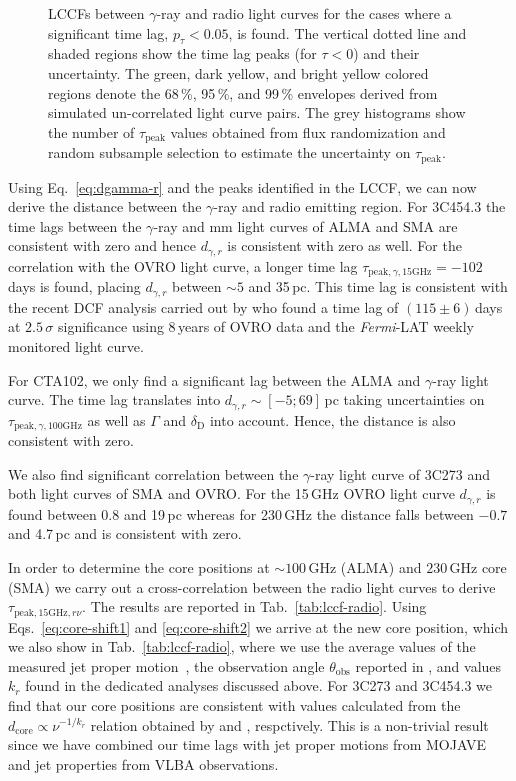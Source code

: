 \documentclass[twocolumn,linenumbers]{aastex62}
\newcommand{\gray}{$\gamma$-ray\xspace}
\newcommand{\fermiLAT}{\emph{Fermi}-LAT\xspace}
\begin{document}
\begin{figure}
    \caption{LCCFs between \gray and radio light curves for the cases where a significant time lag, $p_\tau < 0.05$, is found. The vertical dotted line and shaded regions show the time lag peaks (for $\tau < 0$) and their uncertainty. 
    The green, dark yellow, and bright yellow colored regions denote the 68\,\%, 95\,\%, and 99\,\% envelopes derived from simulated un-correlated light curve pairs. 
    The grey histograms show the number of $\tau_\mathrm{peak}$ values obtained from flux randomization and random subsample selection to estimate the uncertainty on $\tau_\mathrm{peak}$.}
    \label{fig:lccf}
\end{figure}

Using Eq.~\ref{eq:dgamma-r} and the peaks identified in the LCCF, we can now derive the distance between the \gray and radio emitting region. 
For 3C454.3 the time lags between the \gray and mm light curves of ALMA and SMA are consistent with zero and hence $d_{\gamma,r}$ is consistent with zero as well.
For the correlation with the OVRO light curve, a longer time lag $\tau_{\mathrm{peak},\gamma,15\mathrm{GHz}} = -102$ days is found, placing $d_{\gamma,r}$ between $\sim 5$ and 35\,pc.
This time lag is consistent with the recent DCF analysis carried out by \citet{2018MNRAS.480.5517L} who found a time lag of $(115\pm6)$\,days at $2.5\,\sigma$ significance using 8\,years of OVRO data and the \fermiLAT weekly monitored light curve. 

For CTA102, we only find a significant lag between the ALMA and \gray light curve. 
The time lag translates into $d_{\gamma,r} \sim [-5;69]\,$pc taking uncertainties on $\tau_{\mathrm{peak},\gamma,100\mathrm{GHz}}$ as well as $\Gamma$ and $\delta_\mathrm{D}$ into account.
Hence, the distance is also consistent with zero. 

We also find significant correlation between the \gray light curve of 3C273 and both light curves of SMA and OVRO. 
For the 15\,GHz OVRO light curve $d_{\gamma,r}$ is found between 0.8 and 19\,pc whereas for 230\,GHz the distance falls between $-0.7$ and 4.7\,pc and is consistent with zero. 

In order to determine the core positions at $\sim100$\,GHz (ALMA) and $230\,$GHz core (SMA) we carry out a cross-correlation between the radio light curves to derive $\tau_{\mathrm{peak},15\mathrm{GHz},r\nu}$.
The results are reported in Tab.~\ref{tab:lccf-radio}.
Using Eqs.~\ref{eq:core-shift1} and \ref{eq:core-shift2} we arrive at the new core position, which we also show in Tab.~\ref{tab:lccf-radio}, where we use the average values of the measured jet proper motion~\citep[see Table 4 in][]{2016AJ....152...12L}, the observation angle $\theta_\mathrm{obs}$ reported in \citet{2017ApJ...846...98J},
and values $k_r$ found in the dedicated analyses discussed above. 
For 3C273 and 3C454.3 we find that our core positions are consistent with values calculated from the $d_\mathrm{core}\propto\nu^{-1/k_r}$ relation obtained by \citet{2013ARep...57...34V} and \citet{2014MNRAS.437.3396K}, respctively. 
This is a non-trivial result since we have combined our time lags with jet proper motions from MOJAVE and jet properties from VLBA observations. 
\end{document}
